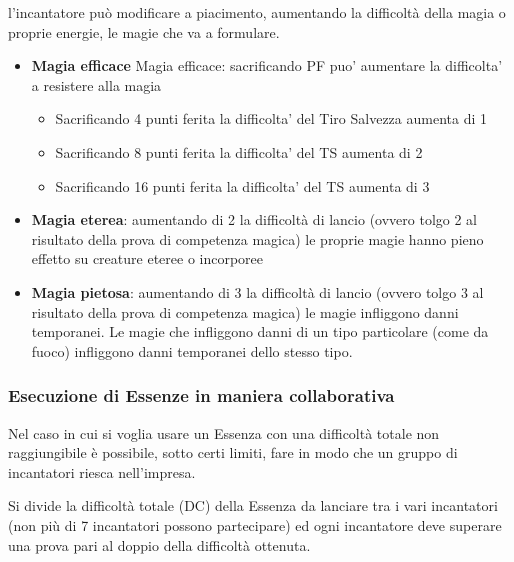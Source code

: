 \documentclass[a4paper,11pt,twoside,openany]{book}
\begin{document}
\label{alterare-le-essenze}

l'incantatore può modificare a piacimento, aumentando la difficoltà della magia o proprie energie, le magie che va a formulare.

\begin{itemize}
\item 
\textbf{Magia efficace} 
Magia efficace: sacrificando PF puo’ aumentare la difficolta’ a resistere alla magia
\begin{itemize}
	\item Sacrificando 4 punti ferita la difficolta’ del Tiro Salvezza aumenta di 1
	\item Sacrificando 8 punti ferita la difficolta’ del TS aumenta di 2

	\item Sacrificando 16 punti ferita la difficolta’ del TS aumenta di 3
\end{itemize}
\end{itemize}
%
\begin{itemize}
\item 
\textbf{Magia eterea}: aumentando di 2 la difficoltà di lancio (ovvero tolgo 2 al risultato della prova di competenza magica) le proprie magie hanno pieno effetto su creature eteree o incorporee 
\end{itemize}
%
\begin{itemize}
\item 
\textbf{Magia pietosa}: aumentando di 3 la difficoltà di lancio (ovvero tolgo 3 al risultato della prova di competenza magica) le magie infliggono danni temporanei. Le magie che infliggono danni di un tipo particolare (come da fuoco) infliggono danni temporanei dello stesso tipo. 
\end{itemize}

\subsubsection{Esecuzione di Essenze in maniera collaborativa}

Nel caso in cui si voglia usare un Essenza con una difficoltà totale non raggiungibile è possibile, sotto certi limiti, fare in modo che un gruppo di incantatori riesca nell'impresa.

Si divide la difficoltà totale (DC) della Essenza da lanciare tra i vari incantatori (non più di 7 incantatori possono partecipare) ed ogni incantatore deve superare una prova pari al doppio della difficoltà ottenuta.
\end{document}
